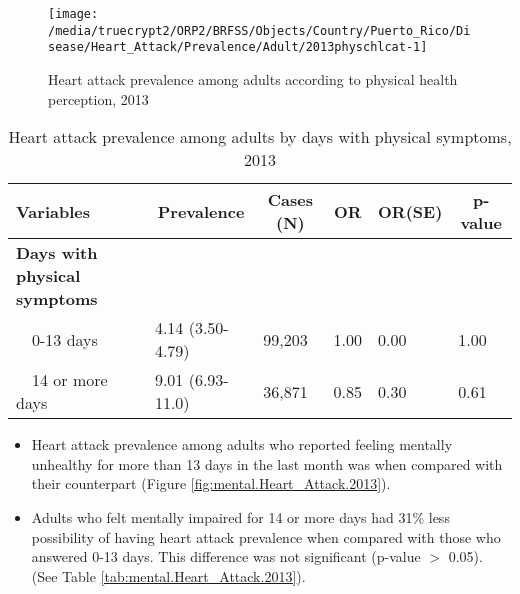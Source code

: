 \begin{figure}[H]
\caption{Heart attack prevalence among adults according to physical health perception, 2013}
\label{fig:phys.Heart_Attack.2013}
\begin{knitrout}
\color{fgcolor}

{\centering \texttt{[image: /media/truecrypt2/ORP2/BRFSS/Objects/Country/Puerto\_Rico/Disease/Heart\_Attack/Prevalence/Adult/2013physchlcat-1]} 

}



\end{knitrout}
 \end{figure}

\begin{table}[H]
\caption{Heart attack prevalence among adults by days with physical symptoms, 2013\label{tab:phys.Heart_Attack.2013}} 
\begin{center}
\begin{tabular}{llllll}
\hline\hline
\multicolumn{1}{l}{Variables}&\multicolumn{1}{c}{Prevalence}&\multicolumn{1}{c}{Cases (N)}&\multicolumn{1}{c}{OR}&\multicolumn{1}{c}{OR(SE)}&\multicolumn{1}{c}{p-value}\tabularnewline
\hline
{\bfseries Days with physical symptoms}&&&&&\tabularnewline
~~0-13 days&4.14 (3.50-4.79)&99,203&1.00&0.00&1.00\tabularnewline
~~14 or more days&9.01 (6.93-11.0)&36,871&0.85&0.30&0.61\tabularnewline
\hline
\end{tabular}\end{center}

\end{table}


 \newpage
\begin{itemize}

\item Heart attack prevalence among adults who reported feeling mentally unhealthy for more than 13 days in the last month was  when compared with their counterpart (Figure \ref{fig:mental.Heart_Attack.2013}).


\item  Adults who felt mentally impaired for 14 or more days had 31\% less possibility of having heart attack prevalence when compared with those who answered 0-13 days. This difference was not significant (p-value $>$ 0.05). (See Table \ref{tab:mental.Heart_Attack.2013}).

\end{itemize}

